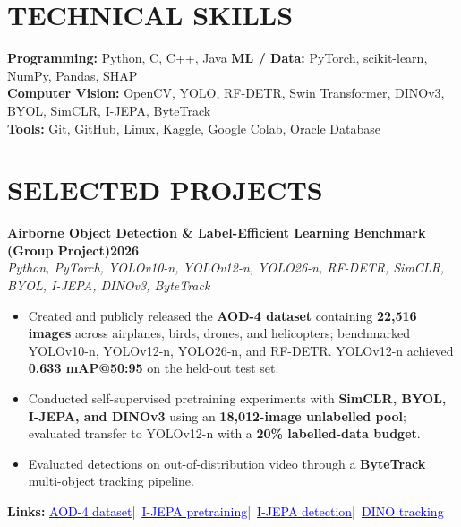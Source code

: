 \documentclass[10pt,a4paper]{article}
\newcommand{\reslink}[2]{\href{#1}{\textcolor{blue}{\underline{#2}}}}
\newcommand{\projectheading}[3]{%
    \vspace{1pt}%
    \textbf{#1}\hfill{\textbf{\small #2}}\\[-1pt]
    {\small\color{muted}\textit{#3}}\\[-2pt]
}
\newcommand{\resourceLine}[1]{%
    {\scriptsize\textbf{Links:} #1}\par\vspace{-1pt}%
}
\begin{document}
\section*{TECHNICAL SKILLS}
\small
\textbf{Programming:} Python, C, C++, Java\quad
\textbf{ML / Data:} PyTorch, scikit-learn, NumPy, Pandas, SHAP\\[-1pt]
\textbf{Computer Vision:} OpenCV, YOLO, RF-DETR, Swin Transformer, DINOv3, BYOL, SimCLR, I-JEPA, ByteTrack\\[-1pt]
\textbf{Tools:} Git, GitHub, Linux, Kaggle, Google Colab, Oracle Database

\section*{SELECTED PROJECTS}

\projectheading
{Airborne Object Detection \& Label-Efficient Learning Benchmark \textnormal{\small (Group Project)}}
{2026}
{Python, PyTorch, YOLOv10-n, YOLOv12-n, YOLO26-n, RF-DETR, SimCLR, BYOL, I-JEPA, DINOv3, ByteTrack}
\begin{itemize}
    \item Created and publicly released the \textbf{AOD-4 dataset} containing \textbf{22,516 images} across airplanes, birds, drones, and helicopters; benchmarked YOLOv10-n, YOLOv12-n, YOLO26-n, and RF-DETR. YOLOv12-n achieved \textbf{0.633 mAP@50:95} on the held-out test set.
    \item Conducted self-supervised pretraining experiments with \textbf{SimCLR, BYOL, I-JEPA, and DINOv3} using an \textbf{18,012-image unlabelled pool}; evaluated transfer to YOLOv12-n with a \textbf{20\% labelled-data budget}.
    \item Evaluated detections on out-of-distribution video through a \textbf{ByteTrack} multi-object tracking pipeline.
\end{itemize}
\resourceLine{\reslink{https://www.kaggle.com/datasets/ahsanurparul/assignment1-group01-cse445-airbornedetection}{AOD-4 dataset}\;|\
\reslink{https://www.kaggle.com/code/ahsanurparul/cse445-group01-partb-3a-ijepa-pretrain}{I-JEPA pretraining}\;|\
\reslink{https://www.kaggle.com/code/ahsanurparul/cse445-group01-assignment01-partb-3b-ijepa-detect}{I-JEPA detection}\;|\
\reslink{https://www.kaggle.com/code/ahsanurparul/dino-tracking-notebook5}{DINO tracking}}
\end{document}
